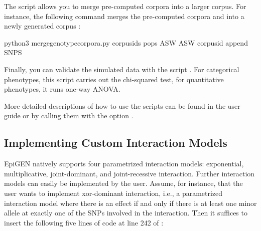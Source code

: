 \documentclass[a4paper,10pt,english]{sphinxhowto}
\begin{document}
The script  allows you to merge pre-computed corpora into a larger corpus. For instance, the following command merges the pre-computed corpora  and  into a newly generated corpus :

\begin{sphinxVerbatim}[commandchars=\\\{\}]
python3 merge\PYGZus{}genotype\PYGZus{}corpora.py \PYGZhy{}\PYGZhy{}corpus\PYGZhy{}ids   \PYGZhy{}\PYGZhy{}pops ASW ASW \PYGZhy{}\PYGZhy{}corpus\PYGZhy{}id  \PYGZhy{}\PYGZhy{}append SNPS
\end{sphinxVerbatim}

Finally, you can validate the simulated data with the script . For categorical phenotypes, this script carries out the chi-squared test, for quantitative phenotypes, it runs one-way ANOVA.

More detailed descriptions of how to use the scripts can be found in the user guide or by calling them with the option .


\subsection{Implementing Custom Interaction Models}
\label{\detokenize{README:implementing-custom-interaction-models}}
EpiGEN natively supports four parametrized interaction models: exponential, multiplicative, joint-dominant, and joint-recessive interaction. Further interaction models can easily be implemented by the user. Assume, for instance, that the user wants to implement xor-dominant interaction, i.e., a parametrized interaction model where there is an effect if and only if there is at least one minor allele at exactly one of the SNPs involved in the interaction. Then it suffices to insert the following five lines of code at line 242 of :

\begin{sphinxVerbatim}[commandchars=\\\{\}]
   
	 \PYG{p}{[}\PYG{p}{]}  
		 
		 
\end{sphinxVerbatim}
\end{document}
